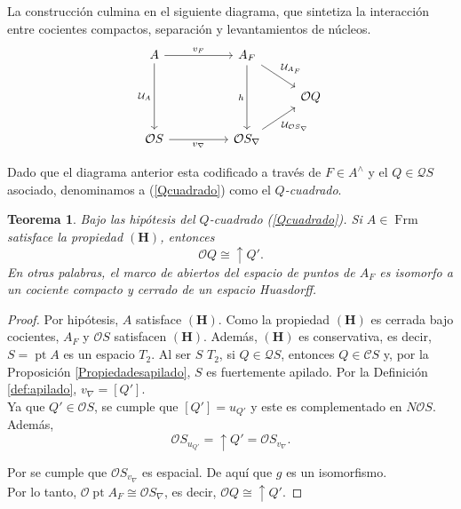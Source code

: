 \documentclass[12pt]{article}
\newtheorem{thm}{Teorema}[section]
\DeclareMathOperator{\Frm}{Frm}
\DeclareMathOperator{\pt}{pt}
\begin{document}
La construcción culmina en el siguiente diagrama, que sintetiza la interacción entre cocientes compactos, separación y levantamientos de núcleos.
\begin{equation}\label{Qcuadrado}
\begin{tikzcd}
	A && {A_F} & \\
	&&& {\mathcal{O}Q} \\
	{\mathcal{O}S} && {\mathcal{O}S_\nabla}
	\arrow["{v_F}", from=1-1, to=1-3]
	\arrow["{\mathcal{U}_A}"', from=1-1, to=3-1]
	\arrow["{\mathcal{U}_{A_F}}", from=1-3, to=2-4]
	\arrow["h"', from=1-3, to=3-3]
	\arrow["{v_\nabla}"', from=3-1, to=3-3]
	\arrow["{\mathcal{U}_{\mathcal{O}S_\nabla}}"', from=3-3, to=2-4]
\end{tikzcd}\end{equation}

Dado que el diagrama anterior esta codificado a través de $F\in A^\wedge$ y el $Q\in \mathcal{Q}S$ asociado, 
denominamos a (\ref{Qcuadrado}) como el \emph{$Q$-cuadrado}.

\begin{thm}\label{haus1}
Bajo las hipótesis del $Q$-cuadrado (\ref{Qcuadrado}). Si $A\in \Frm$ satisface la propiedad $\mathbf{(H)}$, entonces
\[
\mathcal{O}Q\cong \uparrow Q'.
\]
En otras palabras, el marco de abiertos del espacio de puntos de $A_F$ es isomorfo a un cociente compacto
y cerrado de un espacio Huasdorff.
\end{thm}

\begin{proof}
Por hipótesis, $A$ satisface $\mathbf{(H)}$. Como la propiedad $\mathbf{(H)}$ es cerrada bajo cocientes, $A_F$ y $\mathcal{O}S$ satisfacen $\mathbf{(H)}$.
Además, $\mathbf{(H)}$ es conservativa, es decir, $S=\pt A$ es un espacio $T_2$. Al ser $S$ $T_2$, si $Q\in \mathcal{Q}S$, entonces $Q\in \mathcal{C}S$ y, por la Proposición \ref{Propiedadesapilado}, $S$ 
es fuertemente apilado. Por la Definición \ref{def:apilado}, $v_\nabla=[Q']$.\\

Ya que $Q'\in \mathcal{O}S$, se cumple que $[Q']=u_{Q'}$ y este es complementado en $N\mathcal{O}S$. Además,
\[
\mathcal{O}S_{u_{Q'}}=\uparrow Q'=\mathcal{O}S_{v_\nabla}.
\]

Por \cite[Propocisión VI.3.3]{PicadoPultr} se cumple que $\mathcal{O}S_{v_\nabla}$ es espacial. De aquí que $g$ es un isomorfismo.\\

Por lo tanto, $\mathcal{O}\pt A_F\cong \mathcal{O}S_\nabla$, es decir, $\mathcal{O}Q\cong \uparrow Q'$.

\end{proof}
\end{document}
